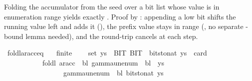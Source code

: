 \begin{isabellebody}
\begin{isamarkuptext}%
Folding the accumulator from the seed 
  over a bit list whose value is in enumeration range yields exactly
  .  Proof by :
  appending a low bit shifts the running value left and adds it
  (), the prefix value stays in range
  (, no separate
  -bound lemma needed), and the  round-trip cancels at each step.%
\end{isamarkuptext}\isamarkuptrue%
\isamarkupfalse%
\ foldl{\isacharunderscore}{\kern0pt}ar{\isacharunderscore}{\kern0pt}acc{\isacharunderscore}{\kern0pt}eq{\isacharcolon}{\kern0pt}\isanewline
\ \ \ {\isachardoublequoteopen}finite\ {\isasymGamma}{\isachardoublequoteclose}\isanewline
\ \ \ {\isachardoublequoteopen}set\ ys\ {\isasymsubseteq}\ {\isacharbraceleft}{\kern0pt}BIT{}{\isacharcomma}{\kern0pt}\ BIT{}{\isacharbraceright}{\kern0pt}\ {\isasymLongrightarrow}\ bits{\isacharunderscore}{\kern0pt}to{\isacharunderscore}{\kern0pt}nat\ ys\ {\isacharless}{\kern0pt}\ card\ {\isasymGamma}\isanewline
\ \ \ \ \ \ \ \ \ \ {\isasymLongrightarrow}\ foldl\ {\isacharparenleft}{\kern0pt}ar{\isacharunderscore}{\kern0pt}acc\ {\isasymGamma}\ bl{\isacharparenright}{\kern0pt}\ {\isacharparenleft}{\kern0pt}gamma{\isacharunderscore}{\kern0pt}unenum\ {\isasymGamma}\ bl\ {}{\isacharparenright}{\kern0pt}\ ys\isanewline
\ \ \ \ \ \ \ \ \ \ \ \ \ \ \ \ {\isacharequal}{\kern0pt}\ gamma{\isacharunderscore}{\kern0pt}unenum\ {\isasymGamma}\ bl\ {\isacharparenleft}{\kern0pt}bits{\isacharunderscore}{\kern0pt}to{\isacharunderscore}{\kern0pt}nat\ ys{\isacharparenright}{\kern0pt}{\isachardoublequoteclose}\isanewline
%
\isadelimproof
%
\endisadelimproof
%
\isatagproof
{}\isamarkupfalse%

\end{isabellebody}
